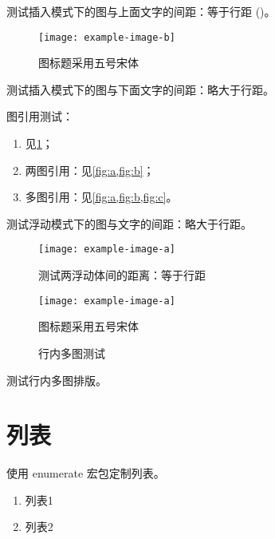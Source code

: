 测试插入模式下的图与上面文字的间距：等于行距 (\the\textfloatsep)。

\begin{figure}[h]
	\centering
	\texttt{[image: example-image-b]}
	\caption{图标题采用五号宋体}
	\label{fig:a}
\end{figure}

测试插入模式下的图与下面文字的间距：略大于行距。

图引用测试：

\begin{enumerate}
	\item	见\cref{fig:a}；
	\item 两图引用：见\cref{fig:a,fig:b}；
	\item 多图引用：见\cref{fig:a,fig:b,fig:c}。
\end{enumerate}

\clearpage

测试浮动模式下的图与文字的间距：略大于行距。

\begin{figure}[t]
	\centering
	\texttt{[image: example-image-a]}
	\caption{测试两浮动体间的距离：等于行距}
	\label{fig:b}
\end{figure}

\begin{figure}[t]
	\centering
	\texttt{[image: example-image-a]}
	\caption{图标题采用五号宋体}
	\label{fig:c}
\end{figure}

\begin{figure}[htb]
	\centering
	\centering
	\centering
	\caption{行内多图测试}
\end{figure}

测试行内多图排版。

\section{列表}

使用 \textsf{enumerate} 宏包定制列表。

\begin{enumerate}
	\item 列表1
	\item 列表2
\end{enumerate}

